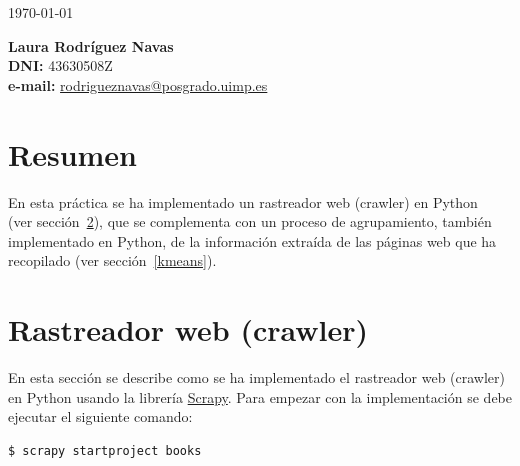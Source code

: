 \documentclass{uimppracticas}
\begin{document}
	
\frontmatter


\begin{center}
\large \today
\end{center}

\vspace{40mm}

\begin{flushright}
 	{\bf Laura Rodríguez Navas}\\
 	\textbf{DNI:} 43630508Z\\
 	\textbf{e-mail:} \href{rodrigueznavas@posgrado.uimp.es}{rodrigueznavas@posgrado.uimp.es}
\end{flushright}

\newpage

\tableofcontents

\newpage

\mainmatter

\setlength\parskip{2.5ex}

\section{Resumen}

En esta práctica se ha implementado un rastreador web (crawler) en Python~\cite{GitHubRepo} (ver sección~\ref{crawler}), que se complementa con un proceso de agrupamiento, también implementado en Python, de la información extraída de las páginas web que ha recopilado (ver sección~\ref{kmeans}). 

\section{Rastreador web (crawler)}\label{crawler}

En esta sección se describe como se ha implementado el rastreador web (crawler) en Python usando la librería \href{https://scrapy.org/}{Scrapy}. Para empezar con la implementación se debe ejecutar el siguiente comando:

\begin{lstlisting}[language=bash]
$ scrapy startproject books
\end{lstlisting}
\end{document}
